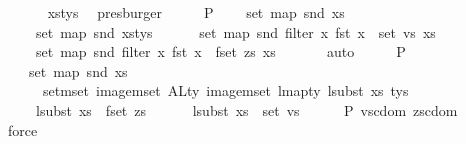 \begin{isabellebody}
\ \ \ \ \ \isamarkupfalse%
\ xs{\isacharunderscore}{\kern0pt}tys\ \isamarkupfalse%
\ presburger\isanewline
\ \ \isamarkupfalse%
\ \isamarkupfalse%
\ P{}{}{\isacharcolon}{\kern0pt}\isanewline
\ \ \ \ {\isachardoublequoteopen}set\ {\isacharparenleft}{\kern0pt}map\ snd\ xs{\isacharparenright}{\kern0pt}\ {\isacharequal}{\kern0pt}\isanewline
\ \ \ \ \ set\ {\isacharparenleft}{\kern0pt}map\ snd\ xs{\isacharunderscore}{\kern0pt}tys{\isacharparenright}{\kern0pt}\ {\isasymunion}\isanewline
\ \ \ \ \ set\ {\isacharparenleft}{\kern0pt}map\ snd\ {\isacharparenleft}{\kern0pt}filter\ {\isacharparenleft}{\kern0pt}{\isasymlambda}x{\isachardot}{\kern0pt}\ fst\ x\ {\isasymin}\ set\ vs{\isacharparenright}{\kern0pt}\ xs{\isacharparenright}{\kern0pt}{\isacharparenright}{\kern0pt}\ {\isasymunion}\isanewline
\ \ \ \ \ set\ {\isacharparenleft}{\kern0pt}map\ snd\ {\isacharparenleft}{\kern0pt}filter\ {\isacharparenleft}{\kern0pt}{\isasymlambda}x{\isachardot}{\kern0pt}\ fst\ x\ {\isasymin}\ fset\ zs{\isacharparenright}{\kern0pt}\ xs{\isacharparenright}{\kern0pt}{\isacharparenright}{\kern0pt}{\isachardoublequoteclose}\isanewline
\ \ \ \ \ \isamarkupfalse%
\ auto\isanewline
\ \ \isamarkupfalse%
\ \isamarkupfalse%
\ P{}{}{\isacharcolon}{\kern0pt}\isanewline
\ \ \ \ {\isachardoublequoteopen}set\ {\isacharparenleft}{\kern0pt}map\ snd\ xs{\isacharparenright}{\kern0pt}\ {\isacharequal}{\kern0pt}\isanewline
\ \ \ \ \ {\isacharparenleft}{\kern0pt}{\isasymUnion}\ {\isacharparenleft}{\kern0pt}set{\isacharunderscore}{\kern0pt}mset\ {\isacharparenleft}{\kern0pt}image{\isacharunderscore}{\kern0pt}mset\ ALty\ {\isacharparenleft}{\kern0pt}image{\isacharunderscore}{\kern0pt}mset\ {\isacharparenleft}{\kern0pt}lmap{\isacharunderscore}{\kern0pt}ty\ {\isacharparenleft}{\kern0pt}lsubst\ xs{\isacharparenright}{\kern0pt}{\isacharparenright}{\kern0pt}\ tys{\isacharparenright}{\kern0pt}{\isacharparenright}{\kern0pt}{\isacharparenright}{\kern0pt}{\isacharparenright}{\kern0pt}\ {\isasymunion}\isanewline
\ \ \ \ \ lsubst\ xs\ {\isacharbackquote}{\kern0pt}\ fset\ zs\ {\isasymunion}\isanewline
\ \ \ \ \ lsubst\ xs\ {\isacharbackquote}{\kern0pt}\ set\ vs{\isachardoublequoteclose}\isanewline
\ \ \ \ \isamarkupfalse%
\ P{}{}\ vs{\isacharunderscore}{\kern0pt}cdom{}\ zs{\isacharunderscore}{\kern0pt}cdom{}\ \isamarkupfalse%
\ force\isanewline
\ \ \isamarkupfalse%

\end{isabellebody}
